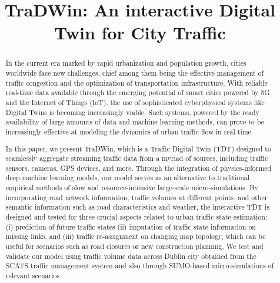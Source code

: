 \documentclass[conference]{IEEEtran}
\newcommand{\name}{TraDWin}
\begin{document}
\title{\name: An interactive Digital Twin for City Traffic}

\author{
    \and
}

\maketitle

\begin{abstract}
In the current era marked by rapid urbanization and population growth, cities worldwide face new challenges, chief among them being the effective management of traffic congestion and the optimization of transportation infrastructure. With reliable real-time data available through the emerging potential of smart cities powered by 5G and the Internet of Things (IoT), the use of sophisticated cyberphysical systems like Digital Twins is becoming increasingly viable. Such systems, powered by the ready availability of large amounts of data and machine learning methods, can prove to be increasingly effective at modeling the dynamics of urban traffic flow in real-time.

In this paper, we present \name, which is a Traffic Digital Twin (TDT) designed to seamlessly aggregate streaming traffic data from a myriad of sources, including traffic sensors, cameras, GPS devices, and more. Through the integration of physics-informed deep machine learning models, our model serves as an alternative to traditional empirical methods of slow and resource-intensive large-scale micro-simulations. By incorporating road network information, traffic volumes at different points, and other semantic information such as road characteristics and weather, the interactive TDT is designed and tested for three crucial aspects related to urban traffic state estimation: (i) prediction of future traffic states (ii) imputation of traffic state information on missing links, and (iii) traffic re-assignment on changing map topology, which can be useful for scenarios such as road closures or new construction planning. We test and validate our model using traffic volume data across Dublin city obtained from the SCATS traffic management system and also through SUMO-based micro-simulations of relevant scenarios.

\end{abstract}
\end{document}
